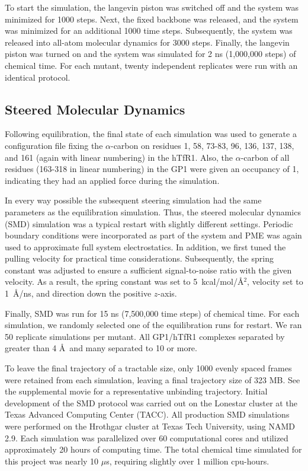 \documentclass[12pt]{article}
\begin{document}
To start the simulation, the langevin piston was switched off and the system was minimized for 1000 steps. Next, the fixed backbone was released, and the system was minimized for an additional 1000 time steps. Subsequently, the system was released into all-atom molecular dynamics for 3000 steps. Finally, the langevin piston was turned on and the system was simulated for 2 ns (1,000,000 steps) of chemical time. For each mutant, twenty independent replicates were run with an identical protocol.

\subsection*{Steered Molecular Dynamics}

Following equilibration, the final state of each simulation was used to generate a configuration file fixing the $\alpha$-carbon on residues 1, 58, 73-83, 96, 136, 137, 138, and 161 (again with linear numbering) in the hTfR1. Also, the $\alpha$-carbon of all residues (163-318 in linear numbering) in the GP1 were given an occupancy of 1, indicating they had an applied force during the simulation. 

In every way possible the subsequent steering simulation had the same parameters as the equilibration simulation. Thus, the steered molecular dynamics (SMD) \citep{Is2001B} simulation was a typical restart with slightly different settings. Periodic boundary conditions were incorporated as part of the system and PME was again used to approximate full system electrostatics. In addition, we first tuned the pulling velocity for practical time considerations. Subsequently, the spring constant was adjusted to ensure a sufficient signal-to-noise ratio with the given velocity. As a result, the spring constant was set to 5~kcal/mol/\AA$^2$, velocity set to 1~\AA/ns, and direction down the positive $z$-axis.

Finally, SMD was run for 15 ns (7,500,000 time steps) of chemical time. For each simulation, we randomly selected one of the equilibration runs for restart. We ran 50 replicate simulations per mutant. All GP1/hTfR1 complexes separated by greater than 4 \AA\ and many separated to 10 or more.

To leave the final trajectory of a tractable size, only 1000 evenly spaced frames were retained from each simulation, leaving a final trajectory size of 323 MB. See the supplemental movie for a representative unbinding trajectory. Initial development of the SMD protocol was carried out on the Lonestar cluster at the Texas Advanced Computing Center (TACC). All production SMD simulations were performed on the Hrothgar cluster at Texas Tech University, using NAMD 2.9. Each simulation was parallelized over 60 computational cores and utilized approximately 20 hours of computing time. The total chemical time simulated for this project was nearly 10 $\mu$s, requiring slightly over 1 million cpu-hours.
\end{document}
